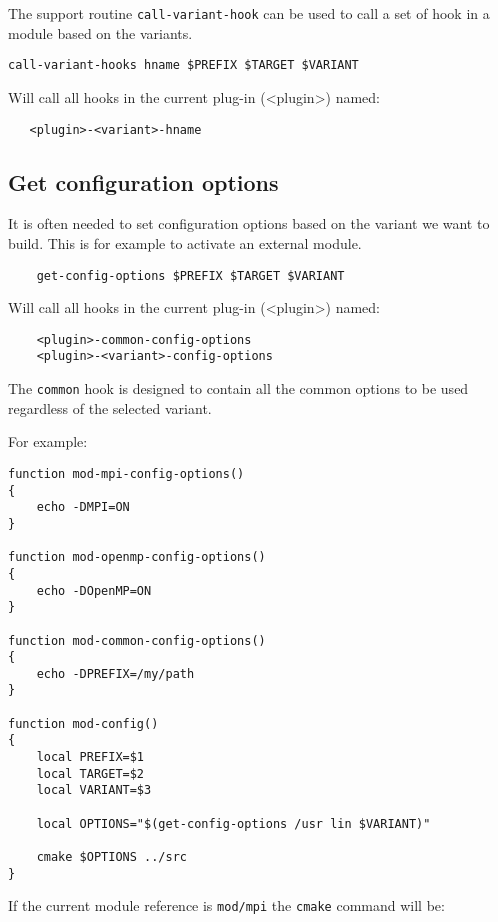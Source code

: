 \documentclass[a4paper,12pt,twoside]{article}
\newcommand{\code}[1]{\texttt{#1}}
\begin{document}
The support routine \code{call-variant-hook} can be used to call a set of hook in a module based on the variants.

\begin{lstlisting}
call-variant-hooks hname $PREFIX $TARGET $VARIANT
\end{lstlisting}

Will call all hooks in the current plug-in (<plugin>) named:

\begin{lstlisting}
   <plugin>-<variant>-hname
\end{lstlisting}

\subsection{Get configuration options}
\label{get config options}

It is often needed to set configuration options based on the variant we want to build. This is for example to activate an external module.

\begin{lstlisting}
	get-config-options $PREFIX $TARGET $VARIANT
\end{lstlisting}

Will call all hooks in the current plug-in (<plugin>) named:

\begin{lstlisting}
	<plugin>-common-config-options
	<plugin>-<variant>-config-options
\end{lstlisting}

The \code{common} hook is designed to contain all the common options to be used regardless of the selected variant.

For example:

\begin{lstlisting}
function mod-mpi-config-options()
{
	echo -DMPI=ON
}

function mod-openmp-config-options()
{
	echo -DOpenMP=ON
}

function mod-common-config-options()
{
	echo -DPREFIX=/my/path
}

function mod-config()
{
	local PREFIX=$1
	local TARGET=$2
	local VARIANT=$3

	local OPTIONS="$(get-config-options /usr lin $VARIANT)"

	cmake $OPTIONS ../src
}
\end{lstlisting}

If the current module reference is \code{mod/mpi} the \code{cmake} command will be:
\end{document}

